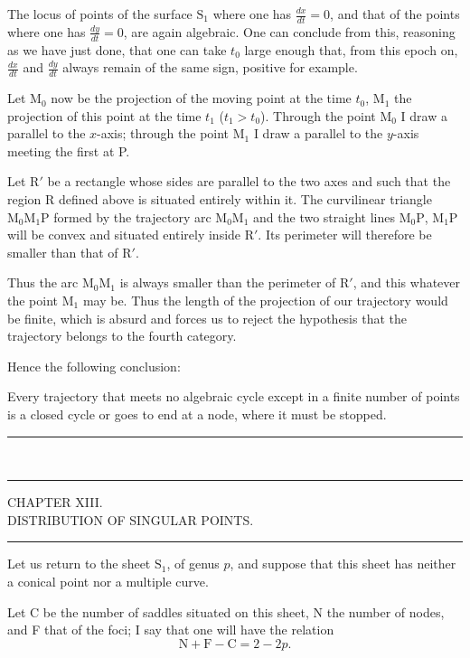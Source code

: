\documentclass[11pt]{article}
\newcommand{\ornament}{\begin{center}\rule{2.5em}{0.4pt}\,\raisebox{0.1ex}{\tiny$\bullet\bullet\bullet$}\,\rule{2.5em}{0.4pt}\end{center}}
\newcommand{\shortline}{\begin{center}\rule{3.5em}{0.4pt}\end{center}}
\begin{document}
The locus of points of the surface $\mathrm{S}_1$ where one has $\frac{dx}{dt}=0$, and that of the points where one has $\frac{dy}{dt}=0$, are again algebraic. One can conclude from this, reasoning as we have just done, that one can take $t_0$ large enough that, from this epoch on, $\frac{dx}{dt}$ and $\frac{dy}{dt}$ always remain of the same sign, positive for example.

Let $\mathrm{M}_0$ now be the projection of the moving point at the time $t_0$, $\mathrm{M}_1$ the projection of this point at the time $t_1$ ($t_1>t_0$). Through the point $\mathrm{M}_0$ I draw a parallel to the $x$-axis; through the point $\mathrm{M}_1$ I draw a parallel to the $y$-axis meeting the first at P.

Let R$'$ be a rectangle whose sides are parallel to the two axes and such that the region R defined above is situated entirely within it. The curvilinear triangle $\mathrm{M}_0\mathrm{M}_1\mathrm{P}$ formed by the trajectory arc $\mathrm{M}_0\mathrm{M}_1$ and the two straight lines $\mathrm{M}_0\mathrm{P}$, $\mathrm{M}_1\mathrm{P}$ will be convex and situated entirely inside R$'$. Its perimeter will therefore be smaller than that of R$'$.

Thus the arc $\mathrm{M}_0\mathrm{M}_1$ is always smaller than the perimeter of R$'$, and this whatever the point $\mathrm{M}_1$ may be. Thus the length of the projection of our trajectory would be finite, which is absurd and forces us to reject the hypothesis that the trajectory belongs to the fourth category.

Hence the following conclusion:

Every trajectory that meets no algebraic cycle except in a finite number of points is a closed cycle or goes to end at a node, where it must be stopped.

\ornament

\begin{center}
{\large CHAPTER XIII.}\\[0.4em]
{\small DISTRIBUTION OF SINGULAR POINTS.}
\end{center}
\shortline

Let us return to the sheet $\mathrm{S}_1$, of genus $p$, and suppose that this sheet has neither a conical point nor a multiple curve.

Let C be the number of saddles situated on this sheet, N the number of nodes, and F that of the foci; I say that one will have the relation
\[
\mathrm{N}+\mathrm{F}-\mathrm{C}=2-2p.
\]
\end{document}
